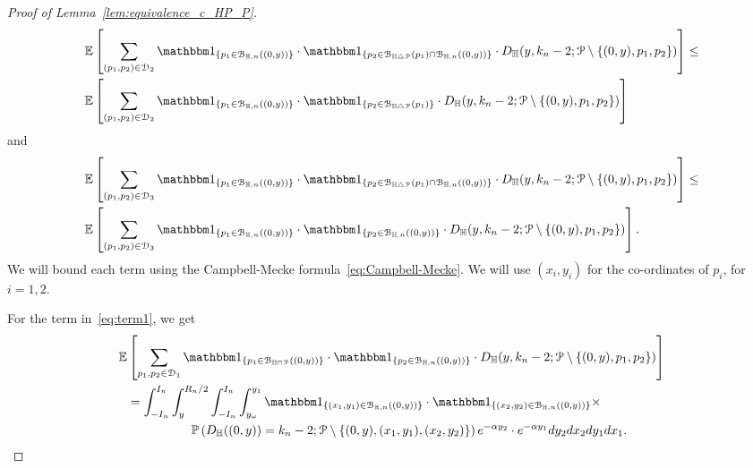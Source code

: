 \begin{proof}[Proof of Lemma~\ref{lem:equivalence_c_HP_P}]
\begin{equation} \label{eq:term2}
\begin{split}
&{\mathbb E} \left[  \sum_{(p_1, p_2)\in \dom{2}} \ind{p_1 \in \BallHyp{(0,y)}} \cdot \ind{p_2 \in \BallSym{p_1}\cap \BallHyp{(0,y)}} \cdot D_\H (y,k_n-2;\Pcal \setminus \{ (0,y),p_1,p_2\})  \right] \leq \\
& {\mathbb E} \left[  \sum_{(p_1, p_2)\in \dom{2}} \ind{p_1 \in \BallHyp{(0,y)}} \cdot \ind{p_2 \in \BallSym{p_1}} \cdot D_\H (y,k_n-2;\Pcal \setminus \{ (0,y),p_1,p_2\})  \right]
\end{split}
\end{equation}
and 
\begin{equation}\label{eq:term3}
\begin{split}
&{\mathbb E} \left[  \sum_{(p_1, p_2)\in \dom{3}} \ind{p_1 \in \BallHyp{(0,y)}} \cdot \ind{p_2 \in \BallSym{p_1}\cap \BallHyp{(0,y)}} \cdot D_\H (y,k_n-2;\Pcal \setminus \{ (0,y),p_1,p_2\})  \right] \leq \\
&{\mathbb E} \left[  \sum_{(p_1, p_2)\in \dom{3}} \ind{p_1 \in \BallHyp{(0,y)}} \cdot \ind{p_2 \in \BallHyp{(0,y)}} \cdot D_\H (y,k_n-2;\Pcal \setminus \{ (0,y),p_1,p_2\})  \right].
\end{split}
\end{equation}
We will bound each term using the Campbell-Mecke formula~\eqref{eq:Campbell-Mecke}. 
We will use $(x_i,y_i)$ for the co-ordinates of $p_i$, for $i=1,2$.


For the term in~\eqref{eq:term1}, we get
\begin{equation} \label{eq:1sum-expansion}
\begin{split} 
{\mathbb E}& \left[  \sum_{p_1, p_2\in \dom{1}} \ind{p_1 \in \BallInter{(0,y)}} \cdot \ind{p_2 \in \BallHyp{(0,y)}} \cdot 
D_\H (y,k_n-2;\Pcal \setminus \{ (0,y),p_1,p_2\})  \right] \\
&=\int_{-I_n}^{I_n} \int_y^{R_n/2}\int_{-I_n}^{I_n} \int_{y_\omega}^{y_1}
 \ind{(x_1,y_1) \in \BallHyp{(0,y)}} \cdot 
 \ind{(x_2,y_2) \in \BallHyp{(0,y)}}\times \\
& \hspace{1.8cm} \Prob{D_\H ((0,y))=k_n-2;\Pcal \setminus \{ (0,y),(x_1,y_1), (x_2,y_2)\}}
  e^{-\alpha y_2} \cdot e^{-\alpha y_1} dy_2 dx_2dy_1 dx_1.
\end{split}
\end{equation}


\end{proof}
